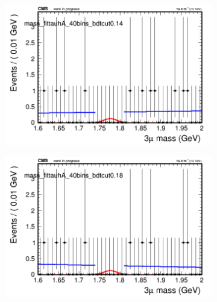 \begin{figure}[H]
\begin{subfigure}{0.2\textwidth}
        \caption{}
    \end{subfigure}
    \begin{subfigure}{0.2\textwidth}
        \includegraphics[width=\textwidth]{unfixed_exp/plots/tauhA/massfit_tauhA_40bins_bdtcut0.14.png}
        \caption{}
    \end{subfigure}
    \begin{subfigure}{0.2\textwidth}
        \includegraphics[width=\textwidth]{unfixed_exp/plots/tauhA/massfit_tauhA_40bins_bdtcut0.18.png}
        \caption{}
    \end{subfigure}
    \begin{subfigure}{0.2\textwidth}

\end{subfigure}
\end{figure}
